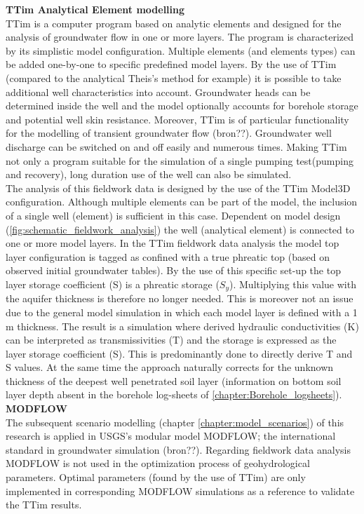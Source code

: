 \textbf{TTim Analytical Element modelling}\\
TTim is a computer program based on analytic elements and designed for the analysis of groundwater flow in one or more layers. The program is characterized by its simplistic model configuration. Multiple elements (and elements types) can be added one-by-one to specific predefined model layers. By the use of TTim (compared to the analytical Theis's method for example) it is possible to take additional well characteristics into account. Groundwater heads can be determined inside the well and the model optionally accounts for borehole storage and potential well skin resistance. Moreover, TTim is of particular functionality for the modelling of transient groundwater flow (bron??). Groundwater well discharge can be switched on and off easily and numerous times. Making TTim not only a program suitable for the simulation of a single pumping test(pumping and recovery), long duration use of the well can also be simulated. \\

The analysis of this fieldwork data is designed by the use of the TTim Model3D configuration. Although multiple elements can be part of the model, the inclusion of a single well (element) is sufficient in this case. Dependent on model design (\ref{fig:schematic_fieldwork_analysis}) the well (analytical element) is connected to one or more model layers. In the TTim fieldwork data analysis the model top layer configuration is tagged as confined with a true phreatic top (based on observed initial groundwater tables). By the use of this specific set-up the top layer storage coefficient (S) is a phreatic storage ($S_y$). Multiplying this value with the aquifer thickness is therefore no longer needed. This is moreover not an issue due to the general model simulation in which each model layer is defined with a 1 m thickness. The result is a simulation where derived hydraulic conductivities (K) can be interpreted as transmissivities (T) and the storage is expressed as the layer storage coefficient (S). This is predominantly done to directly derive T and S values. At the same time the approach naturally corrects for the unknown thickness of the deepest well penetrated soil layer (information on bottom soil layer depth absent in the borehole log-sheets of \ref{chapter:Borehole_logsheets}). \\

\textbf{MODFLOW}\\
The subsequent scenario modelling (chapter \ref{chapter:model_scenarios}) of this research is applied in USGS's modular model MODFLOW; the international standard in groundwater simulation (bron??). Regarding fieldwork data analysis MODFLOW is not used in the optimization process of geohydrological parameters. Optimal parameters (found by the use of TTim) are only implemented in corresponding MODFLOW simulations as a reference to validate the TTim results.

